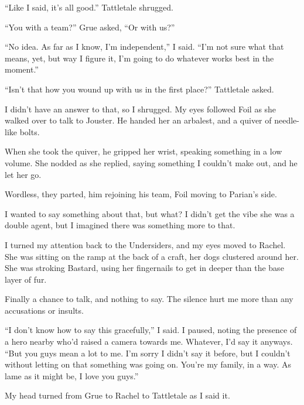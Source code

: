 ``Like I said, it's all good.''  Tattletale shrugged.



``You with a team?'' Grue asked, ``Or with us?''



``No idea.  As far as I know, I'm independent,'' I said.  ``I'm not sure what that means, yet, but way I figure it, I'm going to do whatever works best in the moment.''



``Isn't that how you wound up with us in the first place?'' Tattletale asked.



I didn't have an answer to that, so I shrugged.  My eyes followed Foil as she walked over to talk to Jouster.  He handed her an arbalest, and a quiver of needle-like bolts.



When she took the quiver, he gripped her wrist, speaking something in a low volume.  She nodded as she replied, saying something I couldn't make out, and he let her go.



Wordless, they parted, him rejoining his team, Foil moving to Parian's side.



I wanted to say something about that, but what?  I didn't get the vibe she was a double agent, but I imagined there was something more to that.



I turned my attention back to the Undersiders, and my eyes moved to Rachel.  She was sitting on the ramp at the back of a craft, her dogs clustered around her.  She was stroking Bastard, using her fingernails to get in deeper than the base layer of fur.



Finally a chance to talk, and nothing to say.  The silence hurt me more than any accusations or insults.



``I don't know how to say this gracefully,'' I said.  I paused, noting the presence of a hero nearby who'd raised a camera towards me.  Whatever, I'd say it anyways.  ``But you guys mean a lot to me.  I'm sorry I didn't say it before, but I couldn't without letting on that something was going on.  You're my family, in a way.  As lame as it might be, I love you guys.''



My head turned from Grue to Rachel to Tattletale as I said it.



